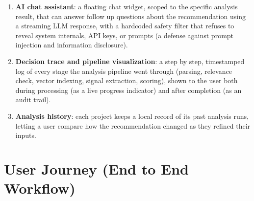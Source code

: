 \documentclass[11pt,a4paper]{report}
\begin{document}
\begin{enumerate}[leftmargin=*]
  \item \textbf{AI chat assistant}: a floating chat widget, scoped to the specific analysis result, that can answer follow up questions about the recommendation using a streaming LLM response, with a hardcoded safety filter that refuses to reveal system internals, API keys, or prompts (a defense against prompt injection and information disclosure).
  \item \textbf{Decision trace and pipeline visualization}: a step by step, timestamped log of every stage the analysis pipeline went through (parsing, relevance check, vector indexing, signal extraction, scoring), shown to the user both during processing (as a live progress indicator) and after completion (as an audit trail).
  \item \textbf{Analysis history}: each project keeps a local record of its past analysis runs, letting a user compare how the recommendation changed as they refined their inputs.
\end{enumerate}

\section{User Journey (End to End Workflow)}
\end{document}
